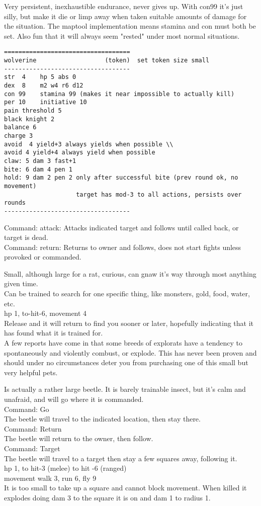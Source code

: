 Very persistent, inexhaustible endurance, never gives up. With con99 it's just silly, but make it die or limp away when taken suitable amounts of damage for the situation. The maptool implementation means stamina and con must both be set. Also fun that it will always seem "rested" under most normal situations.
\goodbreak \small \begin{samepage} \begin{verbatim}
===================================
wolverine                   (token)  set token size small
-----------------------------------
str  4    hp 5 abs 0
dex  8    m2 w4 r6 d12
con 99    stamina 99 (makes it near impossible to actually kill)
per 10    initiative 10
pain threshold 5
black knight 2
balance 6
charge 3
avoid  4 yield+3 always yields when possible \\
avoid 4 yield+4 always yield when possible
claw: 5 dam 3 fast+1
bite: 6 dam 4 pen 1
hold: 9 dam 2 pen 2 only after successful bite (prev round ok, no movement)
                    target has mod-3 to all actions, persists over rounds
-----------------------------------
\end{verbatim} \end{samepage} \normalsize
Command: attack: Attacks indicated target and follows until called back, or target is dead. \\
Command: return: Returns to owner and follows, does not start fights unless provoked or commanded.


Small, although large for a rat, curious, can gnaw it's way through most anything given time. \\
Can be trained to search for one specific thing, like monsters, gold, food, water, etc.\\
hp 1, to-hit-6, movement 4 \\
Release and it will return to find you sooner or later, hopefully indicating that it has found what it is trained for. \\
A few reports have come in that some breeds of explorats have a tendency to spontaneously and violently combust, or explode. This has never been proven and should under no circumstances deter you from purchasing one of this small but very helpful pets.


Is actually a rather large beetle. It is barely trainable insect, but it's calm and unafraid, and will go where it is commanded. \\
Command: Go \\
The beetle will travel to the indicated location, then stay there. \\
Command: Return \\
The beetle will return to the owner, then follow. \\
Command: Target \\
The beetle will travel to a target then stay a few squares away, following it.\\
hp 1, to hit-3 (melee) to hit -6 (ranged) \\
movement walk 3, run 6, fly 9 \\
It is too small to take up a square and cannot block movement. When killed it explodes doing dam 3 to the square it is on and dam 1 to radius 1.


